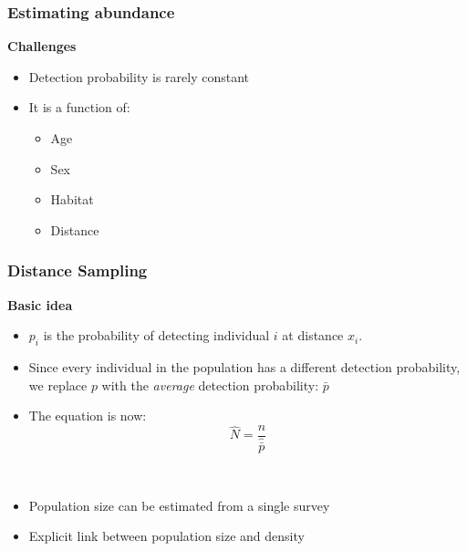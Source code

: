 \documentclass[color=usenames,dvipsnames]{beamer}\usepackage[]{graphicx}\usepackage[]{color}
\begin{document}
\begin{frame}
  \frametitle{Estimating abundance}
  \large
  {\bf Challenges}
  \begin{itemize}
    \item<1-> Detection probability is rarely constant
    \item<2-> It is a function of: %
    \begin{itemize}
      \large
      \item Age
      \item Sex
      \item Habitat
      \item \alert{Distance}
    \end{itemize}
  \end{itemize}

\end{frame}







\begin{frame}
  \frametitle{Distance Sampling}
  \large
  {\bf Basic idea} \\
  \begin{itemize}
  \item<1-> $p_i$ is the probability of detecting individual $i$ at
    distance $x_i$.
  \item<2-> Since every individual in the population has a different
    detection probability, we replace $p$ with the {\it average}
    detection probability: $\bar{p}$
  \item<3-> The equation is now: \\
    \[
      \hat{N} = \frac{n}{\hat{\bar{p}}}
    \]
  \end{itemize}
  \vspace{0.1cm}
   \\
    \begin{itemize}
      \item<5-> Population size can be estimated from a single survey
      \item<6-> Explicit link between population size and density
    \end{itemize}
\end{frame}
\end{document}
